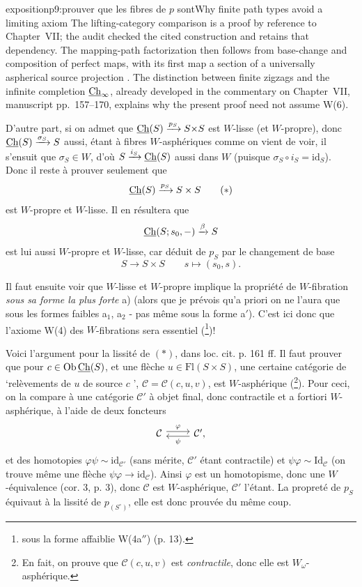 \begin{dcomment}{exposition}{p9:prouver que les fibres de $p$ sont}{Why finite path types avoid a limiting axiom}
The lifting-category comparison is a proof by reference to Chapter~VII; the audit checked the cited construction and retains that dependency. The mapping-path factorization then follows from base-change and composition of perfect maps, with its first map a section of a universally aspherical source projection \citep[manuscript pp.~170--171]{GrothendieckDerivateursVII}. The distinction between finite zigzags and the infinite completion \(\underline{\mathrm{Ch}}_\infty\), already developed in the commentary on Chapter~VII, manuscript pp.~157--170, explains why the present proof need not assume W(6).
\end{dcomment}


D'autre part, si on admet que $\underline{\mathrm{Ch}}(S) \xrightarrow{p_S} S{\times}S$ est $W$-lisse (et $W$-propre), donc $\underline{\mathrm{Ch}}(S) \xrightarrow{\sigma_S} S$ aussi, étant à fibres $W$-asphériques comme on vient de voir, il s'ensuit que $\sigma_S \in W$, d'où $S \xrightarrow{i_S} \underline{\mathrm{Ch}}(S)$ aussi dans $W$ (puisque $\sigma_S \circ i_S = \mathrm{id}_S$). Donc il reste à prouver seulement que
\[ \Ch(S) \xrightarrow{p_S} S \times S \tag*{$(*)$} \]
est $W$-propre et $W$-lisse. Il en résultera que
\[ \underline{\mathrm{Ch}}(S; s_0, -) \xrightarrow{\beta} S \]
est lui aussi $W$-propre et $W$-lisse, car déduit de $p_S$ par le changement de base
\[ S \longrightarrow S \times S \qquad s \longmapsto (s_0, s). \]

Il faut ensuite voir que $W$-lisse et $W$-propre implique la propriété de $W$-fibration \textit{sous sa forme la plus forte} a) (alors que je prévois qu'a priori on ne l'aura que sous les formes faibles a$_1$, a$_2$ - pas même sous la forme a$'$). C'est ici donc que l'axiome W(4) des $W$-fibrations sera essentiel (\footnote[15]{sous la forme affaiblie W(4a$''$) (p. 13).})!

Voici l'argument pour la lissité de $(*)$, dans loc. cit. p. 161 ff. Il faut prouver que pour $c \in \mathrm{Ob}\,\underline{\mathrm{Ch}}(S)$, et une flèche $u \in \mathrm{Fl}(S \times S)$, une certaine catégorie de ‘relèvements de $u$ de source $c$ ’, $\mathcal{C} = \mathcal{C}(c,u,v)$, est $W$-asphérique (\footnote[16]{En fait, on prouve que $\mathcal{C}(c,u,v)$ est \textit{contractile}, donc elle est $W_\omega$-asphérique.}). Pour ceci, on la compare à une catégorie $\mathcal{C}'$ à objet final, donc contractile et a fortiori $W$-asphérique, à l'aide de deux foncteurs
\[ \begin{tikzcd} \mathcal{C} \arrow[r, shift left, "\varphi"] & \mathcal{C}', \arrow[l, shift left, "\psi"] \end{tikzcd} \]
et des homotopies $\varphi\psi \sim \mathrm{id}_{\mathcal{C}'}$ (sans mérite, $\mathcal{C}'$ étant contractile)
et $\psi\varphi \sim \mathrm{Id}_{\mathcal{C}}$ (on trouve même une flèche $\psi\varphi \longrightarrow \mathrm{id}_{\mathcal{C}}$). Ainsi $\varphi$ est un homotopisme, donc une $W$-équivalence (cor. 3, p. 3), donc $\mathcal{C}$ est $W$-asphérique, $\mathcal{C}'$ l'étant. La propreté de $p_S$ équivaut à la lissité de $p_{(S^\circ)}$, elle est donc prouvée du même coup.

